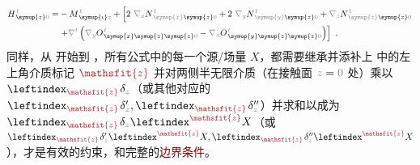 \begin{subequations}
\begin{align}
	H^{\;\!\mathcolor{gray}{t}}_{\;\! \symup{z} \mathcolor{gray}{0}} = & - M^{\;\!\mathcolor{gray}{t}}_{\;\! \symup{\iota} \mathcolor{gray}{z}} + \left[ 2~ \mathcolor{gray}{\nabla_x}
	N^{\;\!\mathcolor{gray}{t}}_{\;\! \mathcolor{gray}{\symup{x}}\symup{z} \mathcolor{gray}{0}} + 2~ \mathcolor{gray}{\nabla_y} N^{\;\!\mathcolor{gray}{t}}_{\;\! \mathcolor{gray}{\symup{y}} \symup{z} \mathcolor{gray}{0}} + \mathcolor{gray}{\nabla_z} N^{\;\!\mathcolor{gray}{t}}_{\;\! \mathcolor{gray}{\symup{z}} \symup{z} \mathcolor{gray}{0}} \right. \label{eq:H_z0=} \\ & \left. + \mathcolor{gray}{\nabla^t} \left( \mathcolor{gray}{\nabla_y}
	O^{\;\!\mathcolor{gray}{t}}_{\;\! \symup{x}\symup{z}\symup{z} \mathcolor{gray}{0}} - \mathcolor{gray}{\nabla_x}
	O^{\;\!\mathcolor{gray}{t}}_{\;\! \symup{y}\symup{z}\symup{z}\mathcolor{gray}{0}} \right) \right]~.
\end{align}
\end{subequations}
同样，从  开始到 ，所有公式中的每一个源/场量 $X$，都需要继承并添补上  中的左上角介质标记 $\textcolor{Maroon}{\mathsfit{z}}$ 并对两侧半无限介质（在接触面 $\mathcolor{gray}{z \mathcolor{black}{=} 0}$ 处）乘以 $\leftindex_{\textcolor{Maroon}{\mathsfit{z}}} \;\! \delta_{\mathcolor{gray}{z}}$（或其他对应的 $\leftindex_{\textcolor{Maroon}{\mathsfit{z}}} \;\! \delta'_{\mathcolor{gray}{z}},\leftindex_{\textcolor{Maroon}{\mathsfit{z}}} \;\! \delta''_{\mathcolor{gray}{z}}$）并求和以成为 $\leftindex_{\textcolor{Maroon}{\mathsfit{z}}} \;\! \delta_{\mathcolor{gray}{z}} \leftindex^{\textcolor{Maroon}{\mathsfit{z}}} X$（或 $\leftindex_{\textcolor{Maroon}{\mathsfit{z}}} \;\! \delta'_{\mathcolor{gray}{z}} \leftindex^{\textcolor{Maroon}{\mathsfit{z}}} X,\leftindex_{\textcolor{Maroon}{\mathsfit{z}}} \;\! \delta''_{\mathcolor{gray}{z}} \leftindex^{\textcolor{Maroon}{\mathsfit{z}}} X$），才是有效的约束，和完整的\textcolor{Maroon}{边界条件}。

